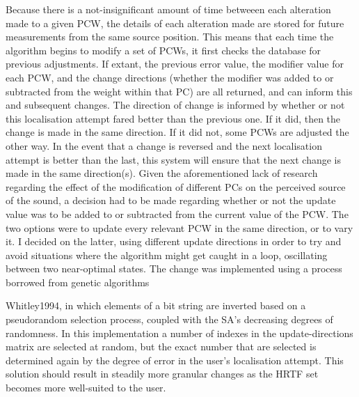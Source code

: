 Because there is a not-insignificant amount of time betweeen each alteration made to a given PCW, the details of each alteration made are stored for future measurements from the same source position. This means that each time the algorithm begins to modify a set of PCWs, it first checks the database for previous adjustments. If extant, the previous error value, the modifier value for each PCW, and the change directions (whether the modifier was added to or subtracted from the weight within that PC) are all returned, and can inform this and subsequent changes. The direction of change is informed by whether or not this localisation attempt fared better than the previous one. If it did, then the change is made in the same direction. If it did not, some PCWs are adjusted the other way. In the event that a change is reversed and the next localisation attempt is better than the last, this system will ensure that the next change is made in the same direction(s). Given the aforementioned lack of research regarding the effect of the modification of different PCs on the perceived source of the sound, a decision had to be made regarding whether or not the update value was to be added to or subtracted from the current value of the PCW. The two options were to update every relevant PCW in the same direction, or to vary it. I decided on the latter, using different update directions in order to try and avoid situations where the algorithm might get caught in a loop, oscillating between two near-optimal states. The change was implemented using a process borrowed from genetic algorithms\

{Whitley1994}, in which elements of a bit string are inverted based on a pseudorandom selection  process, coupled with the SA's decreasing degrees of randomness. In this implementation a number of indexes in the update-directions matrix are selected at random, but the exact number that are selected is determined again by the degree of error in the user's localisation attempt. This solution should result in steadily more granular changes as the HRTF set becomes more well-suited to the user. 


